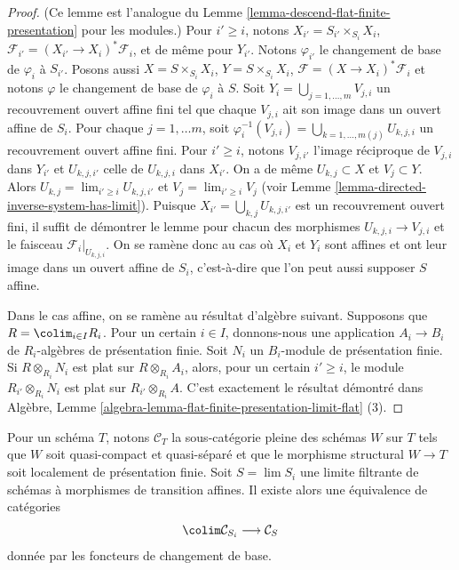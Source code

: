 \begin{proof}
(Ce lemme est l'analogue du
Lemme \ref{lemma-descend-flat-finite-presentation}
pour les modules.)
Pour $i' \geq i$, notons $X_{i'} = S_{i'} \times_{S_i} X_i$,
$\mathcal{F}_{i'} = (X_{i'} \to X_i)^*\mathcal{F}_i$, et de même
pour $Y_{i'}$. Notons $\varphi_{i'}$ le changement de base
de $\varphi_i$ à $S_{i'}$. Posons aussi $X = S \times_{S_i} X_i$,
$Y =S \times_{S_i} X_i$, $\mathcal{F} = (X \to X_i)^*\mathcal{F}_i$
et notons $\varphi$ le changement de base de $\varphi_i$ à $S$.
Soit $Y_i = \bigcup_{j = 1, \ldots, m} V_{j, i}$ un recouvrement ouvert affine
fini tel que chaque $V_{j, i}$ ait son image dans un ouvert affine de $S_i$.
Pour chaque $j = 1, \ldots m$, soit
$\varphi_i^{-1}(V_{j, i}) = \bigcup_{k = 1, \ldots, m(j)} U_{k, j, i}$
un recouvrement ouvert affine fini. Pour $i' \geq i$, notons
$V_{j, i'}$ l'image réciproque de $V_{j, i}$ dans $Y_{i'}$ et
$U_{k, j, i'}$ celle de $U_{k, j, i}$ dans $X_{i'}$.
On a de même $U_{k, j} \subset X$ et $V_j \subset Y$.
Alors $U_{k, j} = \lim_{i' \geq i} U_{k, j, i'}$
et $V_j = \lim_{i' \geq i} V_j$
(voir Lemme \ref{lemma-directed-inverse-system-has-limit}).
Puisque $X_{i'} = \bigcup_{k, j} U_{k, j, i'}$ est un recouvrement ouvert fini,
il suffit de démontrer le lemme pour chacun des morphismes
$U_{k, j, i} \to V_{j, i}$ et le faisceau $\mathcal{F}_i|_{U_{k, j, i}}$.
On se ramène donc au cas où $X_i$ et
$Y_i$ sont affines et ont leur image dans un ouvert affine de $S_i$, c'est-à-dire
que l'on peut aussi supposer $S$ affine.

\medskip\noindent
Dans le cas affine, on se ramène au résultat d'algèbre suivant.
Supposons que $R = \colim_{i \in I} R_i$. Pour un certain $i \in I$,
donnons-nous une application $A_i \to B_i$ de $R_i$-algèbres de présentation finie.
Soit $N_i$ un $B_i$-module de présentation finie.
Si $R \otimes_{R_i} N_i$ est plat sur $R \otimes_{R_i} A_i$,
alors, pour un certain $i' \geq i$, le module
$R_{i'} \otimes_{R_i} N_i$ est plat sur $R_{i'} \otimes_{R_i} A$.
C'est exactement le résultat démontré dans
Algèbre,
Lemme \ref{algebra-lemma-flat-finite-presentation-limit-flat} (3).
\end{proof}

\begin{lemma}
\label{lemma-descend-finite-presentation-variant}
Pour un schéma $T$, notons $\mathcal{C}_T$ la sous-catégorie pleine des
schémas $W$ sur $T$ tels que $W$ soit quasi-compact et quasi-séparé
et que le morphisme structural $W \to T$ soit
localement de présentation finie.
Soit $S = \lim S_i$ une limite filtrante de schémas à morphismes
de transition affines. Il existe alors une équivalence
de catégories
$$
\colim \mathcal{C}_{S_i} \longrightarrow \mathcal{C}_S
$$
donnée par les foncteurs de changement de base.
\end{lemma}

